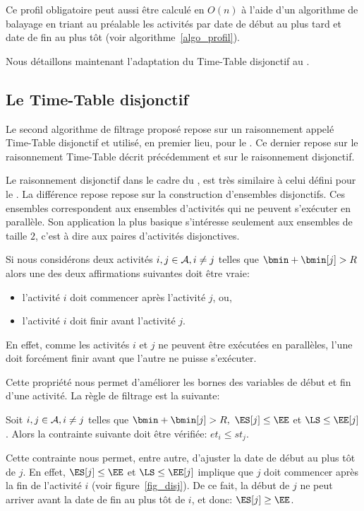 Ce profil obligatoire peut aussi être calculé en $O(n)$ à l'aide d'un
algorithme de balayage en triant au préalable les activités par date
de début au plus tard et date de fin au plus tôt (voir
algorithme~\ref{algo_profil}).

Nous détaillons maintenant l'adaptation du Time-Table disjonctif au
\CECSP. 

\subsection{Le Time-Table disjonctif}

Le second algorithme de filtrage proposé repose sur un raisonnement
appelé Time-Table disjonctif et utilisé, en premier lieu, pour le
\CUSP. Ce dernier repose sur le raisonnement Time-Table décrit
précédemment et sur le raisonnement disjonctif.

Le raisonnement disjonctif dans le cadre du \CECSP, est très similaire
à celui défini pour le \CUSP. La différence repose repose sur la construction d'ensembles
disjonctifs. Ces ensembles correspondent aux ensembles d'activités qui
ne peuvent s'exécuter en parallèle. Son application la plus basique
s'intéresse seulement aux ensembles de taille $2$, c'est à dire aux
paires d'activités disjonctives. 

Si nous considérons deux activités $i, j \in {\cal A}, i\neq j$ telles que
$\bmin + \bmin[j] > R$ alors une des deux affirmations suivantes doit
être vraie:
\begin{itemize}
\item l'activité $i$ doit commencer après l'activité $j$, ou, 
\item l'activité $i$ doit finir avant l'activité $j$.  
\end{itemize}
En effet, comme les activités $i$ et $j$ ne peuvent être exécutées en
parallèles, l'une doit forcément finir avant que l'autre ne puisse
s'exécuter. 

Cette propriété nous permet d'améliorer les bornes des variables de
début et fin d'une activité. La règle de filtrage est la suivante:

\begin{prop}
Soit $i,j \in {\cal A}, i\neq j$ telles que $\bmin + \bmin[j] > R,\ \ES[j] \le
\EE$ et $\LS \le \EE[j]$. Alors la contrainte suivante doit être vérifiée: $et_i\le st_j$. 
\end{prop}

Cette contrainte nous permet, entre autre, d'ajuster la date de début
au plus tôt de $j$. En effet, $\ES[j] \le
\EE$ et $\LS \le \EE[j]$ implique que $j$ doit commencer après la fin
de l'activité $i$ (voir figure~\ref{fig_disj}). De ce fait, la début
de $j$ ne peut arriver avant la date de fin au plus tôt de $i$, et
donc: $\ES[j] \ge \EE$.

